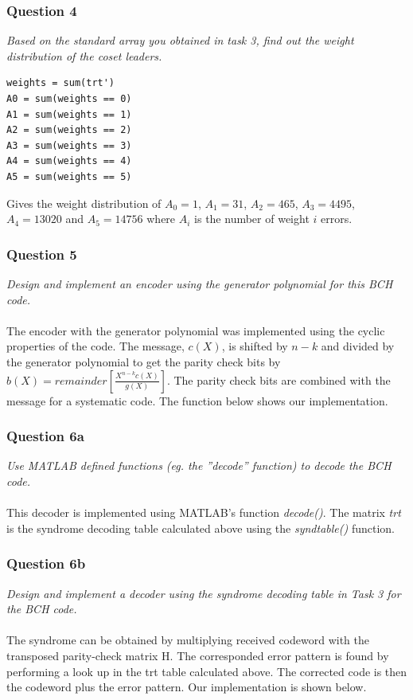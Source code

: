 \documentclass[a4paper]{article}
\begin{document}
\subsubsection*{Question 4} \textit{Based on the standard array you obtained in task 3, find out the weight distribution of the coset leaders.}
\begin{lstlisting}
weights = sum(trt')
A0 = sum(weights == 0)
A1 = sum(weights == 1)
A2 = sum(weights == 2)
A3 = sum(weights == 3)
A4 = sum(weights == 4)
A5 = sum(weights == 5)
\end{lstlisting}
Gives the weight distribution of $A_0 = 1$, $A_1 = 31$, $A_2 = 465$, $A_3 = 4495$, $A_4 = 13020$ and $A_5 = 14756$ where $A_i$ is the number of weight $i$ errors.

\subsubsection*{Question 5} \textit{Design and implement an encoder using the generator polynomial for this BCH code.} \\
\\
The encoder with the generator polynomial was implemented using the cyclic properties of the code. The message, $c(X)$, is shifted by $n-k$ and divided by the generator polynomial to get the parity check bits by $b(X) = remainder[\frac{X^{n-k}c(X)}{g(X)}]$. The parity check bits are combined with the message for a systematic code. The function below shows our implementation.



\subsubsection*{Question 6a} \textit{Use MATLAB defined functions (eg. the ”decode” function) to decode the BCH code.}\\
\\
This decoder is implemented using MATLAB’s function \textit{decode()}. The matrix \textit{trt} is the syndrome decoding table calculated above using the \textit{syndtable()} function.



\subsubsection*{Question 6b} \textit{Design and implement a decoder using the syndrome decoding table in Task 3 for the BCH code.}\\
\\
The syndrome can be obtained by multiplying received codeword with the transposed parity-check matrix H. The corresponded error pattern is found by performing a look up in the trt table calculated above. The corrected code is then the codeword plus the error pattern. Our implementation is shown below.
\end{document}
